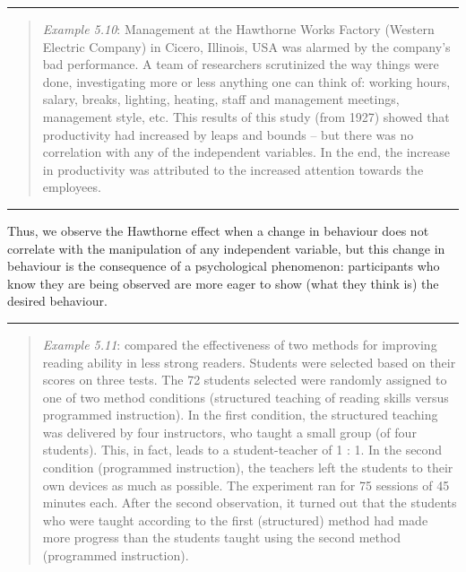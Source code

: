 \documentclass[
]{book}
\begin{document}
\begin{center}\rule{0.5\linewidth}{0.5pt}\end{center}

\begin{quote}
\emph{Example 5.10}: Management at the Hawthorne Works Factory (Western Electric Company) in Cicero, Illinois, USA was alarmed by the company's bad performance. A team of researchers scrutinized the way things were done, investigating more or less anything one can think of: working hours, salary, breaks, lighting, heating, staff and management meetings, management style, etc. This results of this study (from 1927) showed that productivity had increased by leaps and bounds -- but there was no correlation with any of the independent variables. In the end, the increase in productivity was attributed to the increased attention towards the employees.
\end{quote}

\begin{center}\rule{0.5\linewidth}{0.5pt}\end{center}

Thus, we observe the Hawthorne effect when a change in behaviour does not correlate with the manipulation of any independent variable, but this change in behaviour is the consequence of a psychological phenomenon: participants who know they are being observed are more eager to show (what they think is) the desired behaviour.

\begin{center}\rule{0.5\linewidth}{0.5pt}\end{center}

\begin{quote}
\emph{Example 5.11}: \citet{RDCPW78} compared the effectiveness of two methods for improving reading ability in less strong readers. Students were selected based on their scores on three tests. The 72 students selected were randomly assigned to one of two method conditions (structured teaching of reading skills versus programmed instruction). In the first condition, the structured teaching was delivered by four instructors, who taught a small group (of four students). This, in fact, leads to a student-teacher of 1 : 1. In the second condition (programmed instruction), the teachers left the students to their own devices as much as possible. The experiment ran for 75 sessions of 45 minutes each. After the second observation, it turned out that the students who were taught according to the first (structured) method had made more progress than the students taught using the second method (programmed instruction).
\end{quote}
\end{document}
